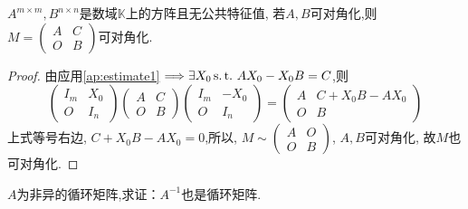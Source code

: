 \begin{example}
  $A^{m\times m},B^{n\times n}$是数域$\mathbb{K}$上的方阵且无公共特征值,
  若$A,B$可对角化,则$M=\left(\begin{smallmatrix}
    A & C \\
    O & B\end{smallmatrix}\right)$可对角化.
\end{example}
\begin{proof}
  由应用\ref{ap:estimate1} $\Longrightarrow \exists X_0 \operatorname{s.t.{}} AX_0-X_0B=C$,则
  \begin{equation*}
    \begin{pmatrix}
      I_m & X_0\\
      O & I_n
    \end{pmatrix}
    \begin{pmatrix}
      A & C\\
      O & B
    \end{pmatrix}
    \begin{pmatrix}
      I_m & -X_0\\
      O & I_n
    \end{pmatrix} =
    \begin{pmatrix}
      A & C+X_0B-AX_0\\
      O & B
    \end{pmatrix}
  \end{equation*}
  上式等号右边, $C+X_0B-AX_0=0$,所以,
  $M \sim \left(\begin{smallmatrix}A & O\\O & B\end{smallmatrix}\right)$,
  $A,B$可对角化, 故$M$也可对角化.
\end{proof}
\begin{example}
  $A$为非异的循环矩阵,求证：$A^{-1}$也是循环矩阵.
\end{example}
